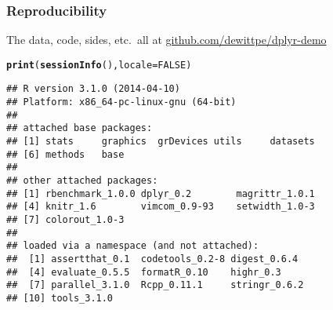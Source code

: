 \documentclass{beamer}\usepackage[]{graphicx}\usepackage[]{color}
\makeatletter
\newcommand{\hlnum}[1]{\textcolor[rgb]{0.686,0.059,0.569}{#1}}%
\newcommand{\hlstd}[1]{\textcolor[rgb]{0.345,0.345,0.345}{#1}}%
\newcommand{\hlkwc}[1]{\textcolor[rgb]{0.333,0.667,0.333}{#1}}%
\newcommand{\hlkwd}[1]{\textcolor[rgb]{0.737,0.353,0.396}{\textbf{#1}}}%
\newenvironment{kframe}{%
 \def\at@end@of@kframe{}%
 \ifinner\ifhmode%
  \def\at@end@of@kframe{\end{minipage}}%
  \begin{minipage}{\columnwidth}%
 \fi\fi%
 \def\FrameCommand##1{\hskip\@totalleftmargin \hskip-\fboxsep
 \colorbox{shadecolor}{##1}\hskip-\fboxsep
     \hskip-\linewidth \hskip-\@totalleftmargin \hskip\columnwidth}%
 \MakeFramed {\advance\hsize-\width
   \@totalleftmargin\z@ \linewidth\hsize
   \@setminipage}}%
 {\par\unskip\endMakeFramed%
 \at@end@of@kframe}
\newenvironment{knitrout}{}{} %
\makeatother
\begin{document}
\begin{frame}[fragile]
  \frametitle{Reproducibility}
  The data, code, sides, etc.\ all at \url{github.com/dewittpe/dplyr-demo}

\begin{knitrout}\footnotesize
{}\color{fgcolor}\begin{kframe}
\begin{alltt}
\hlkwd{print}\hlstd{(}\hlkwd{sessionInfo}\hlstd{(),} \hlkwc{locale} \hlstd{=} \hlnum{FALSE}\hlstd{)}
\end{alltt}
\begin{verbatim}
## R version 3.1.0 (2014-04-10)
## Platform: x86_64-pc-linux-gnu (64-bit)
## 
## attached base packages:
## [1] stats     graphics  grDevices utils     datasets 
## [6] methods   base     
## 
## other attached packages:
## [1] rbenchmark_1.0.0 dplyr_0.2        magrittr_1.0.1  
## [4] knitr_1.6        vimcom_0.9-93    setwidth_1.0-3  
## [7] colorout_1.0-3  
## 
## loaded via a namespace (and not attached):
##  [1] assertthat_0.1  codetools_0.2-8 digest_0.6.4   
##  [4] evaluate_0.5.5  formatR_0.10    highr_0.3      
##  [7] parallel_3.1.0  Rcpp_0.11.1     stringr_0.6.2  
## [10] tools_3.1.0
\end{verbatim}
\end{kframe}
\end{knitrout}
\end{frame} 
\end{document}
